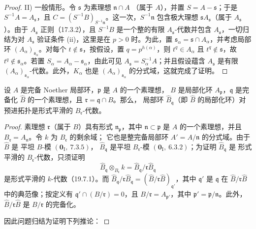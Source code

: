 \begin{proof}
II) 一般情形。令 $\mathfrak s$ 为素理想 $\mathfrak n\cap A$
（属于 $A$），并置 $S=A-\mathfrak s$；于是
$S^{-1}A=A_\mathfrak s$，且
$C=(S^{-1}B)_{S^{-1}\mathfrak n}$。这一次，$S^{-1}\mathfrak n$
包含极大理想 $\mathfrak sA_\mathfrak s$（属于 $A_\mathfrak s$）。由于
$A_\mathfrak s$ 正则（17.3.2），且 $S^{-1}B$ 是一个整的有限
$A_\mathfrak s$-代数并包含 $A_\mathfrak s$，一切归结为对
$A_\mathfrak s$ 验证条件 (ii)，这里是在 $p>0$ 时。为此，置
$\mathfrak s_\alpha=\mathfrak s\cap A_\alpha$，并考虑局部环
$(A_\alpha)_{\mathfrak s_\alpha}$。对每个
$t\notin\mathfrak s$，按假设，置 $q=p^{h(\alpha)}$，则
$t^q\in A_\alpha$ 且 $t^q\notin\mathfrak s$，故
$t^q\notin\mathfrak s_\alpha$。若置
$S_\alpha=A_\alpha-\mathfrak s_\alpha$，由此可见
$A_\mathfrak s=S_\alpha^{-1}A$；并且假设蕴含 $A_\mathfrak s$ 是有限
$(A_\alpha)_{\mathfrak s_\alpha}$-代数。此外，$K_\alpha$ 也是
$(A_\alpha)_{\mathfrak s_\alpha}$ 的分式域，这就完成了证明。
\end{proof}

\begin{theorem}[22.3.3]
\label{0.22.3.3-fr}
设 $A$ 是完备 Noether 局部环，$\mathfrak p$ 是 $A$ 的一个素理想，
$B$ 是局部化环 $A_\mathfrak p$，$\mathfrak q$ 是完备化
$\widehat B$ 的一个素理想，且 $\mathfrak r=\mathfrak q\cap B$。那么，
局部环 $\widehat B_\mathfrak q$（即 $\widehat B$ 的局部化环）对预进拓扑是形式平滑的
$B_\mathfrak r$-代数。
\end{theorem}

\begin{proof}
素理想 $\mathfrak r$（属于 $B$）具有形式 $\mathfrak n_\mathfrak p$，其中
$\mathfrak n\subset\mathfrak p$ 是 $A$ 的一个素理想，并且
$B_\mathfrak r=A_\mathfrak n$。令 $k$ 为 $B_\mathfrak r$ 的剩余域；
它也是整完备局部环 $A'=A/\mathfrak n$ 的分式域。由于 $\widehat B$ 是
平坦 $B$-模 $(\mathbf 0_\mathrm I,~7.3.5)$，
$\widehat B_\mathfrak q$ 是平坦 $B_\mathfrak r$-模
$(\mathbf 0_\mathrm I,~6.3.2)$；为证明 $\widehat B_\mathfrak q$ 是
形式平滑的 $B_\mathfrak r$-代数，只须证明
\[
  \widehat B_\mathfrak q\otimes_{B_\mathfrak r}k
  =\widehat B_\mathfrak q/\mathfrak r\widehat B_\mathfrak q
\]
是形式平滑的 $k$-代数（19.7.1）。而
$\widehat B_\mathfrak q/\mathfrak r\widehat B_\mathfrak q
=(\widehat B/\mathfrak r\widehat B)_{\mathfrak q'}$，其中
$\mathfrak q'$ 是 $\mathfrak q$ 在
$\widehat B/\mathfrak r\widehat B$ 中的典范像；按定义有
$\mathfrak q'\cap(B/\mathfrak r)=0$，且
$B/\mathfrak r=A_{\mathfrak p'}$，其中
$\mathfrak p'=\mathfrak p/\mathfrak n$。此外，
$\widehat B/\mathfrak r\widehat B$ 是 $B/\mathfrak r$ 的完备化。

因此问题归结为证明下列推论：
\end{proof}

